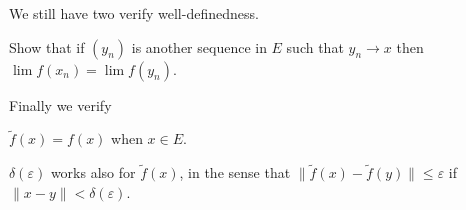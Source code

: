 We still have two verify well-definedness.
\begin{claim}
	Show that if $(y_n)$ is another sequence in $E$ such that $y_n \to x$ then $\lim f(x_n) = \lim f(y_n)$.
\end{claim}

Finally we verify
\begin{claim}
	$\tilde f(x) = f(x)$ when $x \in E$.
\end{claim}

\begin{claim}
	$\delta(\varepsilon)$ works also for $\tilde f(x)$, in the sense that $\|\tilde f(x) - \tilde f(y)\|\le \varepsilon$ if $\|x - y\|< \delta(\varepsilon)$.
\end{claim}



